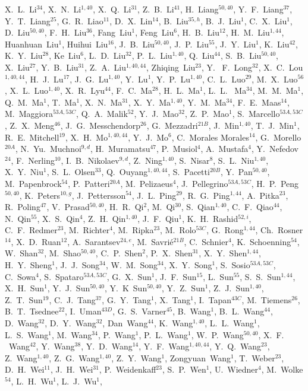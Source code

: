 \begin{small}
\begin{center}
X.~L.~Li$^{34}$, X.~N.~Li$^{1,40}$, X.~Q.~Li$^{31}$, Z.~B.~Li$^{41}$, H.~Liang$^{50,40}$, Y.~F.~Liang$^{37}$, Y.~T.~Liang$^{25}$, G.~R.~Liao$^{11}$, D.~X.~Lin$^{14}$, B.~Liu$^{35,h}$, B.~J.~Liu$^{1}$, C.~X.~Liu$^{1}$, D.~Liu$^{50,40}$, F.~H.~Liu$^{36}$, Fang~Liu$^{1}$, Feng~Liu$^{6}$, H.~B.~Liu$^{12}$, H.~M.~Liu$^{1,44}$, Huanhuan~Liu$^{1}$, Huihui~Liu$^{16}$, J.~B.~Liu$^{50,40}$, J.~P.~Liu$^{55}$, J.~Y.~Liu$^{1}$, K.~Liu$^{42}$, K.~Y.~Liu$^{28}$, Ke~Liu$^{6}$, L.~D.~Liu$^{32}$, P.~L.~Liu$^{1,40}$, Q.~Liu$^{44}$, S.~B.~Liu$^{50,40}$, X.~Liu$^{27}$, Y.~B.~Liu$^{31}$, Z.~A.~Liu$^{1,40,44}$, Zhiqing~Liu$^{23}$, Y. ~F.~Long$^{32}$, X.~C.~Lou$^{1,40,44}$, H.~J.~Lu$^{17}$, J.~G.~Lu$^{1,40}$, Y.~Lu$^{1}$, Y.~P.~Lu$^{1,40}$, C.~L.~Luo$^{29}$, M.~X.~Luo$^{56}$, X.~L.~Luo$^{1,40}$, X.~R.~Lyu$^{44}$, F.~C.~Ma$^{28}$, H.~L.~Ma$^{1}$, L.~L. ~Ma$^{34}$, M.~M.~Ma$^{1}$, Q.~M.~Ma$^{1}$, T.~Ma$^{1}$, X.~N.~Ma$^{31}$, X.~Y.~Ma$^{1,40}$, Y.~M.~Ma$^{34}$, F.~E.~Maas$^{14}$, M.~Maggiora$^{53A,53C}$, Q.~A.~Malik$^{52}$, Y.~J.~Mao$^{32}$, Z.~P.~Mao$^{1}$, S.~Marcello$^{53A,53C}$, Z.~X.~Meng$^{46}$, J.~G.~Messchendorp$^{26}$, G.~Mezzadri$^{21B}$, J.~Min$^{1,40}$, T.~J.~Min$^{1}$, R.~E.~Mitchell$^{19}$, X.~H.~Mo$^{1,40,44}$, Y.~J.~Mo$^{6}$, C.~Morales Morales$^{14}$, G.~Morello$^{20A}$, N.~Yu.~Muchnoi$^{9,d}$, H.~Muramatsu$^{47}$, P.~Musiol$^{4}$, A.~Mustafa$^{4}$, Y.~Nefedov$^{24}$, F.~Nerling$^{10}$, I.~B.~Nikolaev$^{9,d}$, Z.~Ning$^{1,40}$, S.~Nisar$^{8}$, S.~L.~Niu$^{1,40}$, X.~Y.~Niu$^{1}$, S.~L.~Olsen$^{33}$, Q.~Ouyang$^{1,40,44}$, S.~Pacetti$^{20B}$, Y.~Pan$^{50,40}$, M.~Papenbrock$^{54}$, P.~Patteri$^{20A}$, M.~Pelizaeus$^{4}$, J.~Pellegrino$^{53A,53C}$, H.~P.~Peng$^{50,40}$, K.~Peters$^{10,g}$, J.~Pettersson$^{54}$, J.~L.~Ping$^{29}$, R.~G.~Ping$^{1,44}$, A.~Pitka$^{23}$, R.~Poling$^{47}$, V.~Prasad$^{50,40}$, H.~R.~Qi$^{2}$, M.~Qi$^{30}$, S.~Qian$^{1,40}$, C.~F.~Qiao$^{44}$, N.~Qin$^{55}$, X.~S.~Qin$^{4}$, Z.~H.~Qin$^{1,40}$, J.~F.~Qiu$^{1}$, K.~H.~Rashid$^{52,i}$, C.~F.~Redmer$^{23}$, M.~Richter$^{4}$, M.~Ripka$^{23}$, M.~Rolo$^{53C}$, G.~Rong$^{1,44}$, Ch.~Rosner$^{14}$, X.~D.~Ruan$^{12}$, A.~Sarantsev$^{24,e}$, M.~Savri\'e$^{21B}$, C.~Schnier$^{4}$, K.~Schoenning$^{54}$, W.~Shan$^{32}$, M.~Shao$^{50,40}$, C.~P.~Shen$^{2}$, P.~X.~Shen$^{31}$, X.~Y.~Shen$^{1,44}$, H.~Y.~Sheng$^{1}$, J.~J.~Song$^{34}$, W.~M.~Song$^{34}$, X.~Y.~Song$^{1}$, S.~Sosio$^{53A,53C}$, C.~Sowa$^{4}$, S.~Spataro$^{53A,53C}$, G.~X.~Sun$^{1}$, J.~F.~Sun$^{15}$, L.~Sun$^{55}$, S.~S.~Sun$^{1,44}$, X.~H.~Sun$^{1}$, Y.~J.~Sun$^{50,40}$, Y.~K~Sun$^{50,40}$, Y.~Z.~Sun$^{1}$, Z.~J.~Sun$^{1,40}$, Z.~T.~Sun$^{19}$, C.~J.~Tang$^{37}$, G.~Y.~Tang$^{1}$, X.~Tang$^{1}$, I.~Tapan$^{43C}$, M.~Tiemens$^{26}$, B.~T.~Tsednee$^{22}$, I.~Uman$^{43D}$, G.~S.~Varner$^{45}$, B.~Wang$^{1}$, B.~L.~Wang$^{44}$, D.~Wang$^{32}$, D.~Y.~Wang$^{32}$, Dan~Wang$^{44}$, K.~Wang$^{1,40}$, L.~L.~Wang$^{1}$, L.~S.~Wang$^{1}$, M.~Wang$^{34}$, P.~Wang$^{1}$, P.~L.~Wang$^{1}$, W.~P.~Wang$^{50,40}$, X.~F. ~Wang$^{42}$, Y.~Wang$^{38}$, Y.~D.~Wang$^{14}$, Y.~F.~Wang$^{1,40,44}$, Y.~Q.~Wang$^{23}$, Z.~Wang$^{1,40}$, Z.~G.~Wang$^{1,40}$, Z.~Y.~Wang$^{1}$, Zongyuan~Wang$^{1}$, T.~Weber$^{23}$, D.~H.~Wei$^{11}$, J.~H.~Wei$^{31}$, P.~Weidenkaff$^{23}$, S.~P.~Wen$^{1}$, U.~Wiedner$^{4}$, M.~Wolke$^{54}$, L.~H.~Wu$^{1}$, L.~J.~Wu$^{1}$, 
\end{center}
\end{small}
